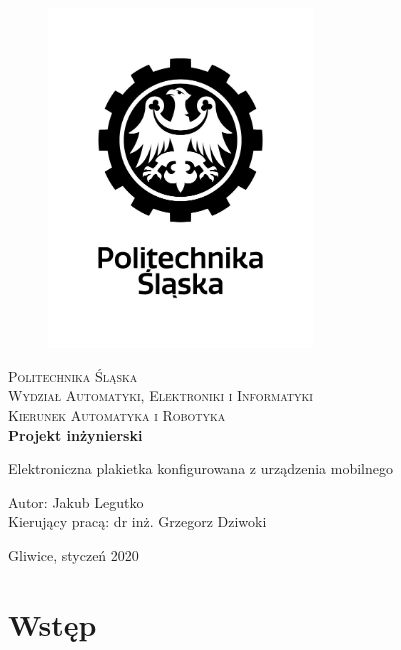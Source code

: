 \documentclass[a4paper,12pt, twoside]{article}
\begin{document}
	\newpage
	\thispagestyle{empty}
	\begin{center}
		
		\begin{figure}
			\centering
			\includegraphics[width=7cm]{images/polsl_logo.jpg}
			\vspace{.5cm}
		\end{figure}
		
		{\fontsize{17}{17}\selectfont
			\textsc{Politechnika Śląska \\[.3cm]
				Wydział Automatyki, Elektroniki i Informatyki  \\[.3cm]
				Kierunek Automatyka i Robotyka  \\[1.5cm]}
			\textbf{Projekt inżynierski \\[0.7cm]}}
		
		\Large
		{Elektroniczna plakietka konfigurowana z urządzenia mobilnego \\[3.5cm]}
		\Large{\begin{flushleft}
				Autor: Jakub Legutko\\
				Kierujący pracą: dr inż. Grzegorz Dziwoki\\[0.3cm]
		\end{flushleft}}
		
		\normalsize
		\vfill Gliwice, styczeń 2020
	\end{center}
	\newpage
	\newpage
	\thispagestyle{empty}
	\tableofcontents
	\newpage
	\newpage
	\clearpage
	\setcounter{page}{1}
	
	\section{Wstęp}
	
\end{document}
